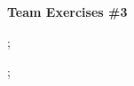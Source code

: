 \documentclass{report}
\begin{document}
\thispagestyle{FirstPage}
\begin{center}
\textbf{\large Team Exercises \#3}
\end{center}

;
\newpage

;
\end{document}
